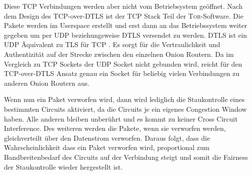 \documentclass[fleqn,envcountsame,runningheads,10pt,a4paper]{llncs}
\begin{document}
Diese TCP Verbindungen werden aber nicht vom Betriebsystem geöffnet. Nach dem Design des TCP-over-DTLS ist der TCP Stack Teil der \textsc{Tor}-Software. Die Pakete werden im Userspace erstellt und erst dann an das Betriebssystem weiter gegeben um per UDP beziehungsweise DTLS versendet zu werden. DTLS ist ein UDP Äquivalent zu TLS für TCP \cite{dtls}. Es sorgt für die Vertraulichkeit und Authentizität auf der Strecke zwischen den einzelnen Onion Routern. Da im Vergleich zu TCP Sockets der UDP Socket nicht gebunden wird, reicht für den TCP-over-DTLS Ansatz genau ein Socket für beliebig vielen Verbindungen zu anderen Onion Routern aus.

Wenn nun ein Paket verworfen wird, dann wird lediglich die Staukontrolle eines bestimmten Circuits aktiviert, da die Circuits je ein eigenes Congestion Window haben. Alle anderen bleiben unberührt und es kommt zu keiner Cross Circuit Interference. Des weiteren werden die Pakete, wenn sie verworfen werden, gleichverteilt über den Datenstrom verworfen. Daraus folgt, dass die Wahrscheinlichkeit dass ein Paket verworfen wird, proportional zum Bandbreitenbedarf des Circuits auf der Verbindung steigt und somit die Fairness der Staukontrolle wieder hergestellt ist.


\begin{figure}[htc]
\end{figure} 


\end{document}
